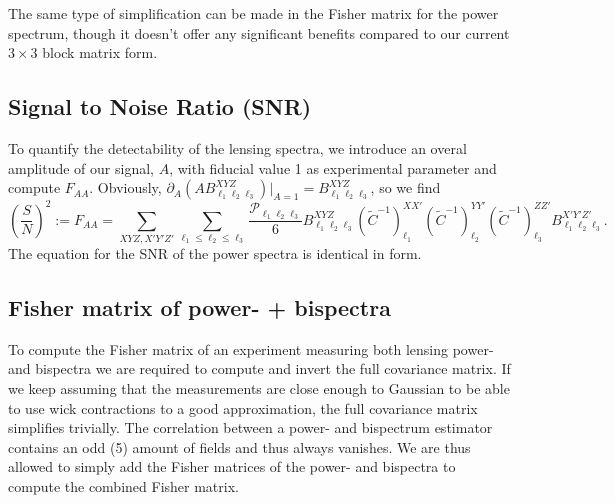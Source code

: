 \documentclass[11pt]{article} %
\DeclareRobustCommand{\Cov}{\ifmmode\text{Cov}\else d\fi}
\newcommand{\br}[1]{\ensuremath{\left( #1 \right)}}
\begin{document}
The same type of simplification can be made in the Fisher matrix for the power spectrum, though it doesn't offer any significant benefits compared to our current $3\times 3$ block matrix form.

\subsection{Signal to Noise Ratio (SNR)}
To quantify the detectability of the lensing spectra, we introduce an overal amplitude of our signal, $A$, with fiducial value 1 as experimental parameter and compute $F_{AA}$. Obviously, $\partial_A\br{A B^{XYZ}_{\ell_1\ell_2\ell_3}}|_{A=1} = B^{XYZ}_{\ell_1\ell_2\ell_3}$, so we find
\begin{equation*}
    \br{\frac{S}{N}}^2 := F_{AA} =
\sum_{XYZ, X'Y'Z'} \sum_{\ell_1\leq \ell_2 \leq \ell_3} \frac{\mathcal P _{\ell_1\ell_2\ell_3}}{6}
B^{X Y Z}_{\ell_1 \ell_2 \ell_3} 
(\tilde C^{-1})^{X X'}_{\ell_1}
(\tilde C^{-1})^{Y Y'}_{\ell_2}
(\tilde C^{-1})^{Z Z'}_{\ell_3}
B^{X' Y' Z'}_{\ell_1 \ell_2 \ell_3}.
\end{equation*}
The equation for the SNR of the power spectra is identical in form.

\subsection{Fisher matrix of power- + bispectra}
To compute the Fisher matrix of an experiment measuring both lensing power- and bispectra we are required to compute and invert the full covariance matrix. If we keep assuming that the measurements are close enough to Gaussian to be able to use wick contractions to a good approximation, the full covariance matrix simplifies trivially. The correlation between a power- and bispectrum estimator contains an odd (5) amount of fields and thus always vanishes. We are thus allowed to simply add the Fisher matrices of the power- and bispectra to compute the combined Fisher matrix.  


\end{document}
